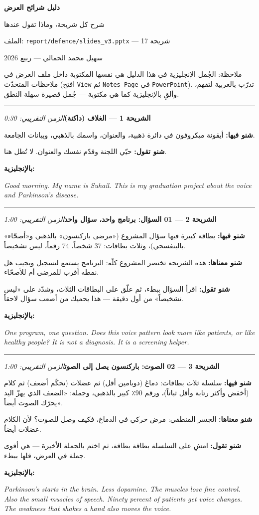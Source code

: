 \documentclass[12pt,a4paper]{article}
\newcommand{\E}[1]{\textenglish{\texttt{#1}}}
\newcommand{\N}[1]{\textenglish{#1}}
\newcommand{\slayd}[3]{%
  \par\vspace{10pt}\hrule\vspace{8pt}%
  {\large\textbf{الشريحة #1 — #2}}\hfill{\small\textit{الزمن التقريبي: #3}}\par\vspace{4pt}%
}
\newcommand{\fiha}{\textbf{شنو فيها: }}
\newcommand{\managementhaha}{\textbf{شنو معناها: }}
\newcommand{\tqul}{\textbf{شنو تقول: }}
\newcommand{\bilinglizi}[1]{\par\textbf{بالإنجليزية:}\par
  \begin{english}\small\itshape #1\end{english}\par}
\begin{document}
\thispagestyle{empty}
\begin{center}
\vspace*{2.2cm}
{\Huge\textbf{دليل شرائح العرض}}\par
\vspace{0.9cm}
{\LARGE شرح كل شريحة، وماذا تقول عندها}\par
\vspace{1.6cm}
{\large الملف: \E{report/defence/slides\_v3.pptx} — \N{17} شريحة}\par
\vspace{0.5cm}
{\large سهيل محمد الحمالي — ربيع \N{2026}}\par
\vspace{2.0cm}
\begin{minipage}{0.85\textwidth}
\small
ملاحظة: الجُمل الإنجليزية في هذا الدليل هي نفسها المكتوبة داخل ملف العرض
في ملاحظات المتحدّث (افتح \E{View} ثم \E{Notes Page} في
\E{PowerPoint}). تدرّب بالعربية لتفهم، وألقِ بالإنجليزية كما هي مكتوبة —
جُمل قصيرة سهلة النطق.
\end{minipage}
\end{center}
\clearpage

\slayd{\N{1}}{الغلاف (داكنة)}{\N{0:30}}
\fiha أيقونة ميكروفون في دائرة ذهبية، والعنوان، واسمك بالذهبي، وبيانات
الجامعة.
\par\tqul حيّي اللجنة وقدّم نفسك والعنوان. لا تُطل هنا.
\bilinglizi{Good morning. My name is Suhail. This is my graduation
project about the voice and Parkinson's disease.}

\slayd{\N{2}}{\N{01} السؤال: برنامج واحد، سؤال واحد}{\N{1:00}}
\fiha بطاقة كبيرة فيها سؤال المشروع («مرضى باركنسون» بالذهبي و«أصحّاء»
بالبنفسجي)، وثلاث بطاقات: \N{37} شخصاً، \N{74} رقماً، ليس تشخيصاً.
\par\managementhaha هذه الشريحة تختصر المشروع كلّه: البرنامج يستمع لتسجيل
ويجيب هل نمطه أقرب للمرضى أم للأصحّاء.
\par\tqul اقرأ السؤال ببطء، ثم علّق على البطاقات الثلاث، وشدّد على «ليس
تشخيصاً» من أول دقيقة — هذا يحميك من أصعب سؤال لاحقاً.
\bilinglizi{One program, one question. Does this voice pattern look more
like patients, or like healthy people? It is not a diagnosis. It is a
screening helper.}

\slayd{\N{3}}{\N{02} الصوت: باركنسون يصل إلى الصوت}{\N{1:00}}
\fiha سلسلة ثلاث بطاقات: دماغ (دوبامين أقل) ثم عضلات (تحكّم أضعف) ثم
كلام (أخفض وأكثر رتابة وأقل ثباتاً)، ورقم \N{90}٪ كبير بالذهبي، وجملة:
«الضعف الذي يهزّ اليد يحرّك الصوت أيضاً».
\par\managementhaha الجسر المنطقي: مرض حركي في الدماغ، فكيف وصل للصوت؟
لأن الكلام عضلات أيضاً.
\par\tqul امشِ على السلسلة بطاقة بطاقة، ثم اختم بالجملة الأخيرة — هي
أقوى جملة في العرض، قلها ببطء.
\bilinglizi{Parkinson's starts in the brain. Less dopamine. The muscles
lose fine control. Also the small muscles of speech. Ninety percent of
patients get voice changes. The weakness that shakes a hand also moves
the voice.}
\end{document}
